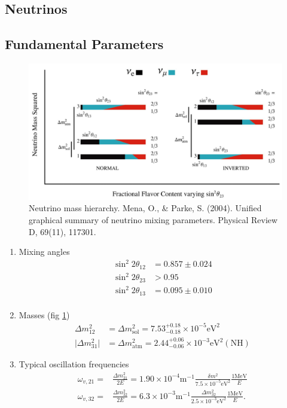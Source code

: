 \documentclass{sciposter}
\begin{document}
\begin{multicols}{3}

\section{Neutrinos}


\subsection{Fundamental Parameters}

\begin{figure}[h]
\centering
\includegraphics[width=\columnwidth]{assets/neutrino-mass-theta23.png}
\caption{Neutrino mass hierarchy. Mena, O., \& Parke, S. (2004). Unified graphical summary of neutrino mixing parameters. Physical Review D, 69(11), 117301.}
\label{fig:neutrino_mass_hierarchy}
\end{figure}


\begin{enumerate}
\item Mixing angles
\begin{align}
\sin^2 2\theta_{12} & = 0.857 \pm 0.024 \\
\sin^2 2\theta_{23} & > 0.95 \\
\sin^2 2\theta_{13} & = 0.095 \pm 0.010 \\
\end{align}
\item Masses (fig \ref{fig:neutrino_mass_hierarchy})
\begin{align}
\Delta m_{12}^2 &= \Delta m_{\mathrm{sol}}^2 = 7.53_{-0.18}^{+0.18} \times 10^{-5} \mathrm{eV}^2 \\
\lvert\Delta m_{31}^2\rvert & = \Delta m_{\mathrm{atm}}^2 = 2.44_{-0.06}^{+0.06}\times 10^{-3} \mathrm{eV^2} (\text{NH})
\end{align}
\item Typical oscillation frequencies
\begin{align}
   \omega_{v,21}=& \frac{\Delta m^2_{21}}{2E} = 1.90\times 10^{-4}  \mathrm{m}^{-1}  \frac{\delta m^2}{7.5\times 10^{-5}\mathrm{eV}^2} \frac{1\mathrm{MeV}}{E} \\
   \omega_{v,32} = & \frac{\Delta m^2_{32}}{2E} = 6.3\times 10^{-3} \mathrm{m}^{-1}  \frac{\Delta m^2_{32}}{2.5\times 10^{-3} \mathrm{eV}^2 } \frac{1\mathrm{MeV}}{E}.
\end{align}
\end{enumerate}








\end{multicols}
\end{document}
